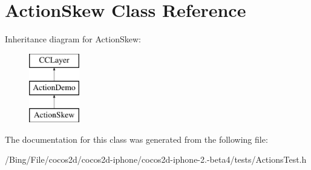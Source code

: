 \hypertarget{interface_action_skew}{\section{Action\-Skew Class Reference}
\label{interface_action_skew}
}
Inheritance diagram for Action\-Skew\-:\begin{figure}[H]
\begin{center}
\leavevmode
\includegraphics[height=3.000000cm]{interface_action_skew}
\end{center}
\end{figure}


The documentation for this class was generated from the following file\-:\begin{DoxyCompactItemize}
\item 
/\-Bing/\-File/cocos2d/cocos2d-\/iphone/cocos2d-\/iphone-\/2.-\/beta4/tests/Actions\-Test.\-h\end{DoxyCompactItemize}
